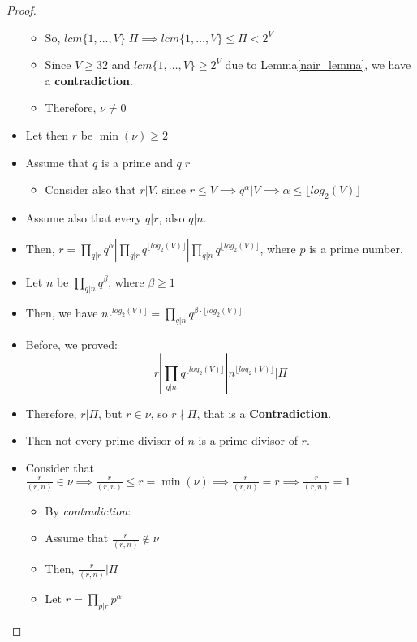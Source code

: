 \begin{proof}
\begin{itemize}
\begin{itemize}
            \item So, $lcm\{1, \dots, V\} | \Pi \implies lcm\{1, \dots, V\} \leq \Pi < 2^{V}$
            \item Since $V \geq 32$ and $lcm\{1, \dots, V\} \geq 2^{V}$ due to Lemma\ref{nair_lemma}, we have a \textbf{contradiction}.
            \item Therefore, $\nu \neq 0$
        \end{itemize}
        \item Let then $r$ be $\operatorname{min}(\nu) \geq 2$
        \item Assume that $q$ is a prime and $q | r$
        \begin{itemize}
            \item Consider also that $r | V$, since $r \leq V \implies q^{\alpha} | V \implies \alpha \leq \lfloor log_{2}(V) \rfloor$
        \end{itemize}
        \item Assume also that every $q | r$, also $q | n$.
        \item Then, $r = \prod_{q | r} q^{\alpha} | \prod_{q | r} q^{\lfloor log_{2}(V) \rfloor} | \prod_{q | n} q^{\lfloor log_{2}(V) \rfloor}$,  where $p$ is a prime number.
        \item Let $n$ be $\prod_{q | n} q^{\beta}$, where $\beta \geq 1$
        \item Then, we have $n^{\lfloor log_{2}(V) \rfloor} = \prod_{q | n} q^{\beta \cdot \lfloor log_{2}(V) \rfloor}$
        \item Before, we proved:
        \[r | \prod_{q | n} q^{\lfloor log_{2}(V) \rfloor} | n^{\lfloor log_{2}(V) \rfloor} | \Pi\]
        \item Therefore, $r | \Pi$, but $r \in \nu$, so $r \nmid \Pi$, that is a \textbf{Contradiction}.
        \item Then not every prime divisor of $n$ is a prime divisor of $r$.
        \item Consider that $\frac{r}{(r,n)} \in \nu \implies \frac{r}{(r,n)} \leq r = \operatorname{min}(\nu) \implies \frac{r}{(r,n)} = r \implies \frac{r}{(r,n)} = 1$
        \begin{itemize}
            \item By \emph{contradiction}:
            \item Assume that $\frac{r}{(r,n)} \not\in \nu$
            \item Then, $\frac{r}{(r,n)} | \Pi$
            \item Let $r = \prod_{p|r} p^{\alpha}$

\end{itemize}
\end{itemize}
\end{proof}

